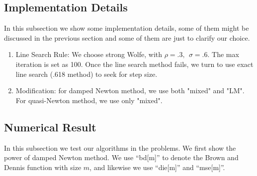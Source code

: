 \documentclass{article}
\begin{document}
\subsection{Implementation Details}
In this subsection we show some implementation details, some of them might be discussed in the previous section and some of them are just to clarify our choice.

\begin{enumerate}
	\item Line Search Rule: We choose strong Wolfe, with $\rho = .3,~~\sigma = .6$. The max iteration is set as 100. Once the line search method fails, we turn to use exact line search (.618 method) to seek for step size.
	\item Modification: for damped Newton method, we use both "mixed" and "LM". For quasi-Newton method, we use only "mixed".
	
\end{enumerate}


\subsection{Numerical Result}
In this subsection we test our algorithms in the problems. We first show the power of damped Newton method. We use ``bd[m]'' to denote the Brown and Dennis function with size $m$, and likewise we use ``die[m]'' and ``mse[m]''. 
\end{document}
